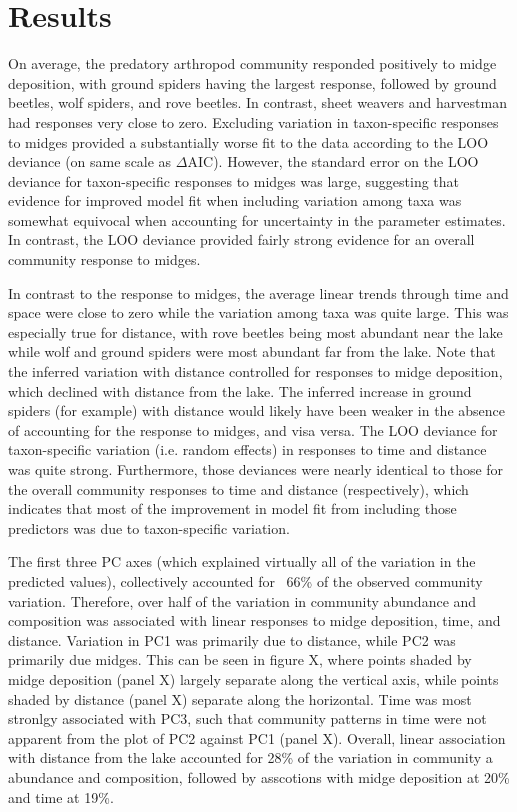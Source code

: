 

\section*{Results}

On average, the predatory arthropod community responded positively to midge deposition,
with ground spiders having the largest
response, followed by ground beetles, wolf spiders, and rove beetles.
In contrast, sheet  weavers and harvestman had responses very close to zero.
Excluding variation in taxon-specific responses to midges provided a substantially
worse fit to the data according to the LOO deviance (on same scale as $\Delta$AIC).
However, the standard error on the LOO deviance for taxon-specific responses to midges was
large, suggesting that evidence for improved model fit when including variation among
taxa was somewhat equivocal when accounting for uncertainty in the parameter estimates.
In contrast, the LOO deviance provided fairly strong evidence for an overall
community response to midges.

In contrast to the response to midges, the average linear trends through
time and space were close to zero while the variation among taxa was quite large.
This was especially true for distance, with rove beetles being most abundant near
the lake while wolf and ground spiders were most abundant far from the lake.
Note that the inferred variation with distance controlled for responses to midge
deposition, which declined with distance from the lake.
The inferred increase in ground spiders (for example) with distance
would likely have been weaker in the absence of accounting for the response to midges,
and visa versa.
The LOO deviance for taxon-specific variation (i.e. random effects) in responses to time
and distance was quite strong.
Furthermore, those deviances were nearly identical to those for the overall community
responses to time and distance (respectively), which indicates that most of the
improvement in model fit from including those predictors was due to taxon-specific
variation.

The first three PC axes (which explained virtually all of the variation in the
predicted values), collectively accounted for ~66\% of the observed community variation.
Therefore, over half of the variation in community abundance and composition was
associated with linear responses to midge deposition, time, and distance.
Variation in PC1 was primarily due to distance, while PC2 was primarily due midges.
This can be seen in figure X, where points shaded by midge deposition (panel X)
largely separate along the vertical axis, while points shaded by distance (panel X)
separate along the horizontal.
Time was most stronlgy associated with PC3, such that community patterns in time were
not apparent from the plot of PC2 against PC1 (panel X).
Overall, linear association with distance from the lake accounted for
28\% of the variation in community a abundance and composition,
followed by asscotions with midge deposition at 20\% and time at 19\%.

